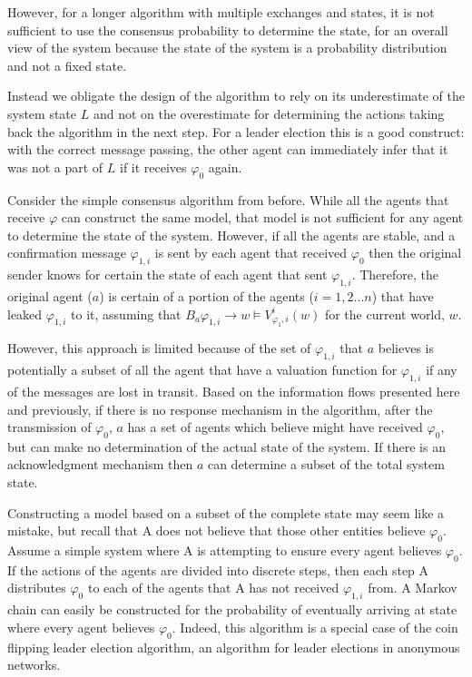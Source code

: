 However, for a longer algorithm with multiple exchanges and states, it is not sufficient to use the consensus probability to determine the state, for an overall view of the system because the state of the system is a probability distribution and not a fixed state.

Instead we obligate the design of the algorithm to rely on its underestimate of the system state $L$ and not on the overestimate for determining the actions taking back the algorithm in the next step. For a leader election this is a good construct: with the correct message passing, the other agent can immediately infer that it was not a part of $L$ if it receives $\varphi_0$ again. 

Consider the simple consensus algorithm from before. While all the agents that receive $\varphi$ can construct the same model, that model is not sufficient for any agent to determine the state of the system. However, if all the agents are stable, and a confirmation message $\varphi_{1,i}$ is sent by each agent that received $\varphi_0$ then the original sender knows for certain the state of each agent that sent $\varphi_{1,i}$. Therefore, the original agent ($a$) is certain of a portion of the agents ($i=1,2...n$) that have leaked $\varphi_{1,i}$ to it, assuming that $B_a \varphi_{1,i} \rightarrow w \vDash V_{\varphi_1,i}^i(w)$ for the current world, $w$.

However, this approach is limited because of the set of $\varphi_{1,i}$ that $a$ believes is potentially a subset of all the agent that have a valuation function for $\varphi_{1,i}$ if any of the messages are lost in transit. Based on the information flows presented here and previously, if there is no response mechanism in the algorithm, after the transmission of $\varphi_0$, $a$ has a set of agents which believe might have received $\varphi_0$, but can make no determination of the actual state of the system. If there is an acknowledgment mechanism then $a$ can determine a subset of the total system state. 

Constructing a model based on a subset of the complete state may seem like a mistake, but recall that A does not believe that those other entities believe $\varphi_0$. Assume a simple system where A is attempting to ensure every agent believes $\varphi_0$. If the actions of the agents are divided into discrete steps, then each step A distributes $\varphi_0$ to each of the agents that A has not received $\varphi_{1,i}$ from. A Markov chain can easily be constructed for the probability of eventually arriving at state where every agent believes $\varphi_0$. Indeed, this algorithm is a special case of the coin flipping leader election algorithm, an algorithm for leader elections in anonymous networks.

